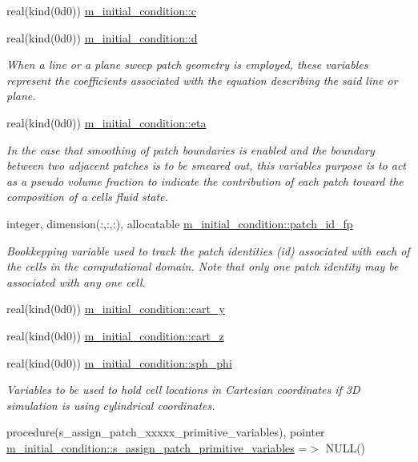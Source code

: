 \begin{DoxyCompactItemize}
\item 
real(kind(0d0)) \hyperlink{namespacem__initial__condition_a03d80b7b8ee41e5b16d996b46a605706}{m\+\_\+initial\+\_\+condition\+::c}
\item 
real(kind(0d0)) \hyperlink{namespacem__initial__condition_af692b3658ab0d7bcda937394fe3e2903}{m\+\_\+initial\+\_\+condition\+::d}
\begin{DoxyCompactList}\small\item\em When a line or a plane sweep patch geometry is employed, these variables represent the coefficients associated with the equation describing the said line or plane. \end{DoxyCompactList}\item 
real(kind(0d0)) \hyperlink{namespacem__initial__condition_a44e267143646437278341b252110443b}{m\+\_\+initial\+\_\+condition\+::eta}
\begin{DoxyCompactList}\small\item\em In the case that smoothing of patch boundaries is enabled and the boundary between two adjacent patches is to be smeared out, this variable\textquotesingle{}s purpose is to act as a pseudo volume fraction to indicate the contribution of each patch toward the composition of a cell\textquotesingle{}s fluid state. \end{DoxyCompactList}\item 
integer, dimension(\+:,\+:,\+:), allocatable \hyperlink{namespacem__initial__condition_a0014f6589f0b33ea2372c1d4b7f0c824}{m\+\_\+initial\+\_\+condition\+::patch\+\_\+id\+\_\+fp}
\begin{DoxyCompactList}\small\item\em Bookkepping variable used to track the patch identities (id) associated with each of the cells in the computational domain. Note that only one patch identity may be associated with any one cell. \end{DoxyCompactList}\item 
real(kind(0d0)) \hyperlink{namespacem__initial__condition_a71a9905eff9a292e2fc61b0e25e47db0}{m\+\_\+initial\+\_\+condition\+::cart\+\_\+y}
\item 
real(kind(0d0)) \hyperlink{namespacem__initial__condition_a224e30cb2d1e2e99f2c2c059a1227d49}{m\+\_\+initial\+\_\+condition\+::cart\+\_\+z}
\item 
real(kind(0d0)) \hyperlink{namespacem__initial__condition_aba65d4cbd29f3b8eda828037c7215e2d}{m\+\_\+initial\+\_\+condition\+::sph\+\_\+phi}
\begin{DoxyCompactList}\small\item\em Variables to be used to hold cell locations in Cartesian coordinates if 3D simulation is using cylindrical coordinates. \end{DoxyCompactList}\item 
procedure(s\+\_\+assign\+\_\+patch\+\_\+xxxxx\+\_\+primitive\+\_\+variables), pointer \hyperlink{namespacem__initial__condition_a3151c58d3a628c7ac8aff34bce727867}{m\+\_\+initial\+\_\+condition\+::s\+\_\+assign\+\_\+patch\+\_\+primitive\+\_\+variables} =$>$ N\+U\+LL()
\end{DoxyCompactItemize}


